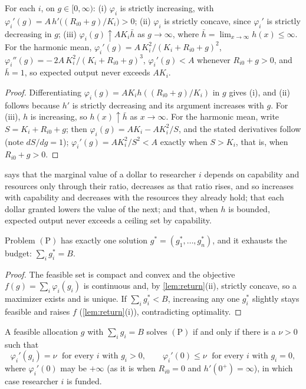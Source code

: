 \begin{lemma}\label{lem:return}
For each $i$, on $g \in [0, \infty)$: (i) $\varphi_i$ is strictly increasing, with $\varphi_i'(g) = A\,h'\!\big((R_{i0} + g)/K_i\big) > 0$; (ii) $\varphi_i$ is strictly concave, since $\varphi_i'$ is strictly decreasing in $g$; (iii) $\varphi_i(g) \uparrow A K_i \bar h$ as $g \to \infty$, where $\bar h = \lim_{x \to \infty} h(x) \leq \infty$. For the harmonic mean, $\varphi_i'(g) = A\,K_i^2/(K_i + R_{i0} + g)^2$, $\varphi_i''(g) = -\,2A\,K_i^2/(K_i + R_{i0} + g)^3$, $\varphi_i'(g) < A$ whenever $R_{i0} + g > 0$, and $\bar h = 1$, so expected output never exceeds $AK_i$.
\end{lemma}

\begin{proof}
Differentiating $\varphi_i(g) = A K_i h((R_{i0} + g)/K_i)$ in $g$ gives (i), and (ii) follows because $h'$ is strictly decreasing and its argument increases with $g$. For (iii), $h$ is increasing, so $h(x) \uparrow \bar h$ as $x \to \infty$. For the harmonic mean, write $S = K_i + R_{i0} + g$; then $\varphi_i(g) = AK_i - AK_i^2/S$, and the stated derivatives follow (note $dS/dg = 1$); $\varphi_i'(g) = AK_i^2/S^2 < A$ exactly when $S > K_i$, that is, when $R_{i0} + g > 0$.
\end{proof}

 says that the marginal value of a dollar to researcher $i$ depends on capability and resources only through their ratio, decreases as that ratio rises, and so increases with capability and decreases with the resources they already hold; that each dollar granted lowers the value of the next; and that, when $h$ is bounded, expected output never exceeds a ceiling set by capability.

\begin{lemma}\label{lem:existence}
Problem $(\mathrm{P})$ has exactly one solution $g^* = (g_1^*, \ldots, g_n^*)$, and it exhausts the budget: $\sum_i g_i^* = B$.
\end{lemma}
\begin{proof}
The feasible set is compact and convex and the objective $f(g) = \sum_i \varphi_i(g_i)$ is continuous and, by \cref{lem:return}(ii), strictly concave, so a maximizer exists and is unique. If $\sum_i g_i^* < B$, increasing any one $g_i^*$ slightly stays feasible and raises $f$ (\cref{lem:return}(i)), contradicting optimality.
\end{proof}
\begin{lemma}\label{lem:emv}
A feasible allocation $g$ with $\sum_i g_i = B$ solves $(\mathrm{P})$ if and only if there is a $\nu > 0$ such that
\[
\varphi_i'(g_i) = \nu \;\text{ for every } i \text{ with } g_i > 0, \qquad \varphi_i'(0) \leq \nu \;\text{ for every } i \text{ with } g_i = 0,
\]
where $\varphi_i'(0)$ may be $+\infty$ (as it is when $R_{i0} = 0$ and $h'(0^+) = \infty$), in which case researcher $i$ is funded.
\end{lemma}

